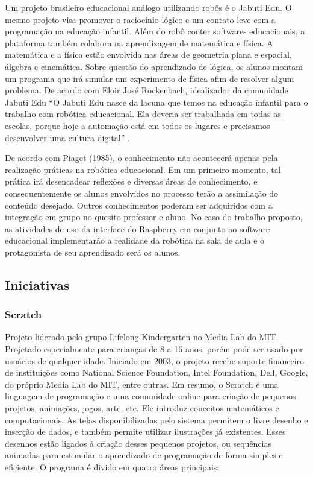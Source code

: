 Um projeto brasileiro educacional análogo utilizando robôs é o Jabuti Edu. O mesmo projeto visa promover o raciocínio lógico e um contato leve com a programação na educação infantil.  Além do robô conter softwares educacionais,  a plataforma também colabora na aprendizagem de matemática e física. A matemática e a física estão envolvida nas áreas de geometria plana e espacial, álgebra e cinemática. Sobre questão do aprendizado de lógica, os alunos montam um programa que irá simular um experimento de física afim de resolver algum problema.  De acordo com Eloir José Rockenbach, idealizador da comunidade Jabuti Edu “O Jabuti Edu nasce da lacuna que temos na educação infantil para o trabalho com robótica educacional. Ela deveria ser trabalhada em todas as escolas, porque hoje a automação está em todos os lugares e precisamos desenvolver uma cultura digital” \cite{piaget:1985}.

De acordo com Piaget (1985), o conhecimento não acontecerá apenas pela realização práticas na robótica educacional. Em um primeiro momento, tal prática irá desencadear reflexões e diversas áreas de conhecimento, e consequentemente os alunos envolvidos no processo terão a assimilação do conteúdo desejado. Outros conhecimentos poderam ser adquiridos com a integração em grupo no quesito professor e aluno.  No caso do trabalho proposto, as atividades de uso da interface do Raspberry em conjunto ao software educacional implementarão a realidade da robótica na sala de aula e o protagonista de seu aprendizado será os alunos.

\subsection{Iniciativas}

\subsubsection{Scratch}

Projeto liderado pelo grupo Lifelong Kindergarten no Media Lab do MIT. Projetado especialmente para crianças de 8 a 16 anos, porém pode ser usado por usuários de qualquer idade. Iniciado em 2003, o projeto recebe suporte financeiro de instituições como National Science Foundation, Intel Foundation, Dell, Google, do próprio Media Lab do MIT, entre outras.
Em resumo, o Scratch é uma linguagem de programação e uma comunidade online para criação de pequenos projetos, animações, jogos, arte, etc. Ele introduz conceitos matemáticos e computacionais.
As telas disponibilizadas pelo sistema permitem o livre desenho e inserção de dados, e também permite utilizar ilustrações já existentes. Esses desenhos estão ligados à criação desses pequenos projetos, ou sequências animadas para estimular o aprendizado de programação de forma simples e eficiente.
O programa é divido em quatro áreas principais:


